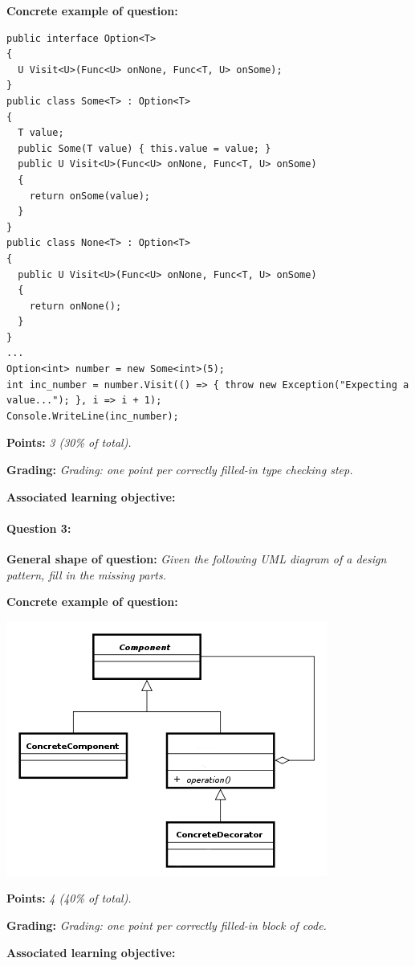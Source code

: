 \textbf{Concrete example of question:} 

\lstset{numbers=left,basicstyle=\ttfamily\small}\lstset{language=[Sharp]C}
\begin{lstlisting}
public interface Option<T>
{
  U Visit<U>(Func<U> onNone, Func<T, U> onSome);
}
public class Some<T> : Option<T>
{
  T value;
  public Some(T value) { this.value = value; }
  public U Visit<U>(Func<U> onNone, Func<T, U> onSome)
  {
    return onSome(value);
  }
}
public class None<T> : Option<T>
{
  public U Visit<U>(Func<U> onNone, Func<T, U> onSome)
  {
    return onNone();
  }
}
...
Option<int> number = new Some<int>(5);
int inc_number = number.Visit(() => { throw new Exception("Expecting a value..."); }, i => i + 1);
Console.WriteLine(inc_number);
\end{lstlisting}

\textbf{Points:} \textit{3 (30\% of total).}

\textbf{Grading:} \textit{Grading: one point per correctly filled-in type checking step.}

\textbf{Associated learning objective:} 

\paragraph{Question 3: }

\textbf{General shape of question:} \textit{Given the following UML diagram of a design pattern, fill in the missing parts.}

\textbf{Concrete example of question:} 

\begin{center}
\includegraphics[width=\textwidth / 2]{decorator_uml}
\end{center}

\textbf{Points:} \textit{4 (40\% of total).}

\textbf{Grading:} \textit{Grading: one point per correctly filled-in block of code.}

\textbf{Associated learning objective:} 

\ \\
